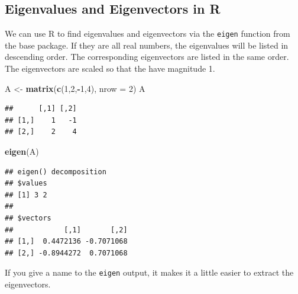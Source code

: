 \documentclass[
]{book}
\newenvironment{Shaded}{\begin{snugshade}}{\end{snugshade}}
\newcommand{\AttributeTok}[1]{\textcolor[rgb]{0.13,0.29,0.53}{#1}}
\newcommand{\DecValTok}[1]{\textcolor[rgb]{0.00,0.00,0.81}{#1}}
\newcommand{\FunctionTok}[1]{\textcolor[rgb]{0.13,0.29,0.53}{\textbf{#1}}}
\newcommand{\NormalTok}[1]{#1}
\newcommand{\OtherTok}[1]{\textcolor[rgb]{0.56,0.35,0.01}{#1}}
\newcommand{\SpecialCharTok}[1]{\textcolor[rgb]{0.81,0.36,0.00}{\textbf{#1}}}
\theoremstyle{definition}
\theoremstyle{definition}
\theoremstyle{definition}
\theoremstyle{definition}
\theoremstyle{remark}
\begin{document}
\subsection*{Eigenvalues and Eigenvectors in R}\label{eigenvalues-and-eigenvectors-in-r}

We can use R to find eigenvalues and eigenvectors via the \texttt{eigen} function from the base package. If they are all real numbers, the eigenvalues will be listed in descending order. The corresponding eigenvectors are listed in the same order. The eigenvectors are scaled so that the have magnitude 1.

\begin{Shaded}
\begin{Highlighting}[]
\NormalTok{A }\OtherTok{\textless{}{-}} \FunctionTok{matrix}\NormalTok{(}\FunctionTok{c}\NormalTok{(}\DecValTok{1}\NormalTok{,}\DecValTok{2}\NormalTok{,}\SpecialCharTok{{-}}\DecValTok{1}\NormalTok{,}\DecValTok{4}\NormalTok{), }\AttributeTok{nrow =} \DecValTok{2}\NormalTok{)}
\NormalTok{A}
\end{Highlighting}
\end{Shaded}

\begin{verbatim}
##      [,1] [,2]
## [1,]    1   -1
## [2,]    2    4
\end{verbatim}

\begin{Shaded}
\begin{Highlighting}[]
\FunctionTok{eigen}\NormalTok{(A)}
\end{Highlighting}
\end{Shaded}

\begin{verbatim}
## eigen() decomposition
## $values
## [1] 3 2
## 
## $vectors
##            [,1]       [,2]
## [1,]  0.4472136 -0.7071068
## [2,] -0.8944272  0.7071068
\end{verbatim}

If you give a name to the \texttt{eigen} output, it makes it a little easier to extract the eigenvectors.

\begin{Shaded}
\end{Shaded}
\end{document}
